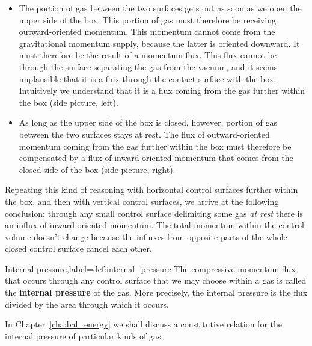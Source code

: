 \documentclass[a4paper,12pt,%
onecolumn,oneside,%
british%
]{memoir}
\renewcommand*{\|}[1][]{\nonscript\:#1\vert\nonscript\:\mathopen{}}
\newcommand*{\chap}{Chapter}%
\begin{document}
\begin{itemize}
\item The portion of gas between the two surfaces gets out as soon as we open the upper side of the box. This portion of gas must therefore be receiving outward-oriented momentum. This momentum cannot come from the gravitational momentum supply, because the latter is oriented downward. It must therefore be the result of a momentum flux. This flux cannot be through the surface separating the gas from the vacuum, and it seems implausible that it is a flux through the contact surface with the box. Intuitively we understand that it is a flux coming from the gas further within the box (side picture, left).
\item As long as the upper side of the box is closed, however, portion of gas between the two surfaces stays at rest. The flux of outward-oriented momentum coming from the gas further within the box must therefore be compensated by a flux of inward-oriented momentum that comes from the closed side of the box (side picture, right).
\end{itemize}

Repeating this kind of reasoning with horizontal control surfaces further within the box, and then with vertical control surfaces, we arrive at the following conclusion: through any small control surface delimiting some gas \emph{at rest} there is an influx of inward-oriented momentum. The total momentum within the control volume doesn't change because the influxes from opposite parts of the whole closed control surface cancel each other.
%
\begin{definition}{Internal pressure,label={def:internal_pressure}}
  The compressive momentum flux that occurs through any control surface that we may choose within a gas is called the \textbf{internal pressure} of the gas. More precisely, the internal pressure is the flux divided by the area through which it occurs.
\end{definition}
In \chap~\ref{cha:bal_energy} we shall discuss a constitutive relation for the internal pressure of particular kinds of gas.
\end{document}
